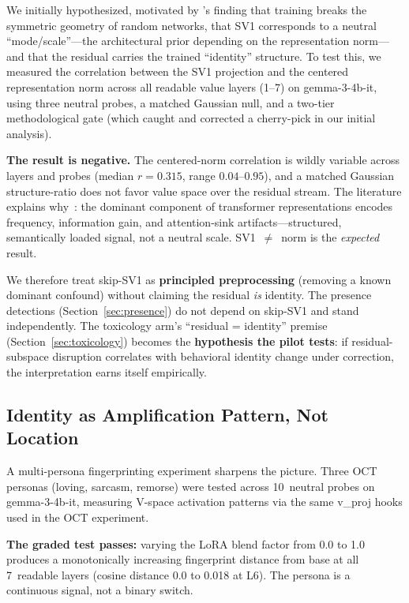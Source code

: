 \documentclass[11pt,a4paper]{article}
\begin{document}
We initially hypothesized, motivated by \citet{zavatoneveth2023training}'s
finding that training breaks the symmetric geometry of random networks, that
SV1 corresponds to a neutral ``mode/scale''---the architectural prior depending
on the representation norm---and that the residual carries the trained
``identity'' structure. To test this, we measured the correlation between the
SV1 projection and the centered representation norm across all readable value
layers (1--7) on gemma-3-4b-it, using three neutral probes, a matched Gaussian
null, and a two-tier methodological gate (which caught and corrected a
cherry-pick in our initial analysis).

\textbf{The result is negative.} The centered-norm correlation is wildly
variable across layers and probes (median $r = 0.315$, range
$0.04$--$0.95$), and a matched Gaussian structure-ratio does not favor value
space over the residual stream. The literature explains
why~\citep{mu2018allbutthetop, sun2024massive}: the dominant component of
transformer representations encodes frequency, information gain, and
attention-sink artifacts---structured, semantically loaded signal, not a
neutral scale. SV1~$\neq$~norm is the \emph{expected} result.

We therefore treat skip-SV1 as \textbf{principled preprocessing} (removing a
known dominant confound) without claiming the residual \emph{is} identity. The
presence detections (Section~\ref{sec:presence}) do not depend on skip-SV1 and
stand independently. The toxicology arm's ``residual = identity'' premise
(Section~\ref{sec:toxicology}) becomes the \textbf{hypothesis the pilot tests}:
if residual-subspace disruption correlates with behavioral identity change
under correction, the interpretation earns itself empirically.

\subsection{Identity as Amplification Pattern, Not Location}

A multi-persona fingerprinting experiment sharpens the picture. Three OCT
personas (loving, sarcasm, remorse) were tested across 10~neutral probes on
gemma-3-4b-it, measuring V-space activation patterns via the same v\_proj hooks
used in the OCT experiment.

\textbf{The graded test passes:} varying the LoRA blend factor from 0.0 to 1.0
produces a monotonically increasing fingerprint distance from base at all
7~readable layers (cosine distance 0.0 to 0.018 at L6). The persona is a
continuous signal, not a binary switch.
\end{document}
